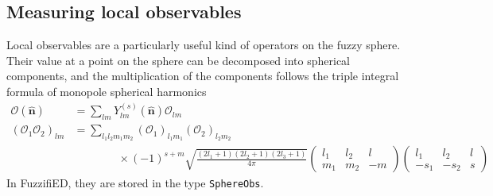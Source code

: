\documentclass{timesjhep}
\begin{document}
\subsection{Measuring local observables}
\label{sec:ed_obs}

Local observables are a particularly useful kind of operators on the fuzzy sphere. Their value at a point on the sphere can be decomposed into spherical components, and the multiplication of the components follows the triple integral formula of monopole spherical harmonics
\begin{align}
    \mathcal{O}(\hat{\mathbf{n}})&=\sum_{lm}Y^{(s)}_{lm}(\hat{\mathbf{n}})\mathcal{O}_{lm}\nonumber\\
    (\mathcal{O}_1\mathcal{O}_2)_{lm}&=\sum_{l_1l_2m_1m_2}(\mathcal{O}_1)_{l_1m_1}(\mathcal{O}_2)_{l_2m_2}\nonumber\\
    &\qquad\qquad\times(-1)^{s+m}\sqrt{\frac{(2l_1+1)(2l_2+1)(2l_3+1)}{4\pi}}\begin{pmatrix}l_1&l_2&l\\m_1&m_2&-m\end{pmatrix}\begin{pmatrix}l_1&l_2&l\\-s_1&-s_2&s\end{pmatrix}
\end{align}
In FuzzifiED, they are stored in the type \lstinline|SphereObs|.
\end{document}
